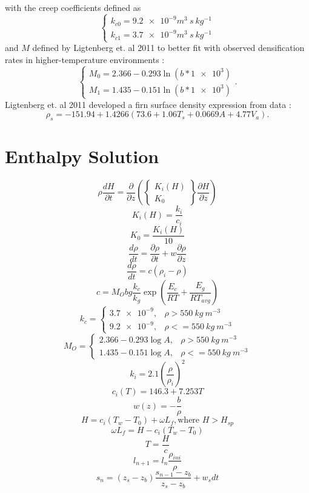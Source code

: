 \documentclass{article}%
\begin{document}
with the creep coefficients defined as
  $$
  \begin{cases}
    k_{c0} = \SI{9.2e-9} m^3\ s\ kg^{-1} \\
    k_{c1} = \SI{3.7e-9} m^3\ s\ kg^{-1}  
  \end{cases}
  $$
and $M$ defined by Ligtenberg et. al 2011 to better fit with observed densification rates in higher-temperature environments :
  $$
  \begin{cases}
    M_0 = 2.366 - 0.293\ln(b*\SI{1e3})\\
    M_1 = 1.435 - 0.151\ln(b*\SI{1e3})
  \end{cases}.
  $$
Ligtenberg et. al 2011 developed a firn surface density expression from data :
  $$ \rho_s = -151.94 + 1.4266(73.6 + 1.06T_s + 0.0669A + 4.77V_a).$$




\section{Enthalpy Solution}
	$$
  \rho \frac{dH}{\partial t} = \frac{\partial}{\partial z} 
    \left( 
      \begin{Bmatrix}
        K_i(H) \\
        K_0
      \end{Bmatrix}
      \frac{\partial H}{\partial z} 
    \right)
  $$
  $$K_i(H) = \frac{k_i}{c_i}$$
  $$K_0 = \frac{K_i(H)}{10}$$
  $$\frac{d \rho}{dt} = \frac{\partial \rho}{\partial t} + 
    w\frac{\partial \rho}{\partial z}$$
  $$\frac{d \rho}{dt} = c(\rho_i - \rho)$$
  $$c = M_Obg\frac{k_c}{k_g}\exp\left(\frac{E_c}{RT} + 
    \frac{E_g}{RT_{avg}}\right)$$
  $$
  k_c =
  \begin{cases}
    \SI{3.7e-9}, &\rho > 550\ kg\ m^{-3}\\
    \SI{9.2e-9}, &\rho <= 550\ kg\ m^{-3}
  \end{cases}
  $$
  $$
  M_O =
  \begin{cases}
    2.366 - 0.293\log A, &\rho > 550\ kg\ m^{-3} \\
    1.435 - 0.151\log A, &\rho <= 550\ kg\ m^{-3}
  \end{cases}
  $$
  $$k_i = 2.1 \left(\frac{\rho}{\rho_i}\right)^2$$
  $$c_i(T) = 146.3 + 7.253 T $$
  $$w(z) = - \frac{b}{\rho}$$
  $$H = c_i(T_w - T_0) + \omega L_f,  \text{where } H > H_{sp}$$
  $$\omega L_f = H - c_i(T_w - T_0)$$
  $$T = \frac{H}{c}$$
  $$l_{n+1} = l_n \frac{\rho_{ini}}{\rho}$$
  $$s_{n} = (z_s - z_b) \frac{s_{n-1} - z_b}{z_{s} - z_b} + w_s dt $$
\end{document}
